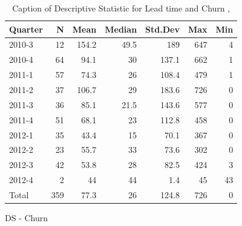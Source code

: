 \documentclass[UKenglish]{ifimaster}  %
\begin{document}
\begin{appendices}
\begin{table}[!htbp]
\begin{adjustwidth}{-1.5cm}{}
\begin{subfigure}[b]{0.3\textwidth}
{\begin{tabular}{ | l | r | r | r | r | r | r | }
 \hline
  \textbf{Quarter} &	\textbf{N} &	\textbf{Mean} &	\textbf{Median} & \textbf{Std.Dev} & \textbf{Max}	& \textbf{Min} \\ \hline
 2010-3   & 12 & 154.2 & 49.5 & 189 & 647 & 4 \\ \hline
 2010-4  & 64 & 94.1 & 30 & 137.1 & 662 & 1 \\ \hline
 2011-1  & 57 & 74.3 & 26 & 108.4 & 479 & 1 \\ \hline
 2011-2  & 37 & 106.7 & 29 & 183.6 & 726 & 0\\ \hline
 2011-3  & 36 & 85.1 & 21.5 & 143.6 & 577 & 0\\ \hline
 2011-4  & 51 & 68.1 & 23 & 112.8 & 458 & 0\\ \hline
 2012-1  & 35 & 43.4 & 15 & 70.1 & 367 & 0\\ \hline
 2012-2  & 23 & 55.7 & 33 & 73.6 & 302 & 0\\ \hline
 2012-3  & 42 & 53.8 & 28 & 82.5 & 424 & 3 \\ \hline
 2012-4  & 2 & 44 & 44 & 1.4 & 45 & 43 \\ \hline
 Total  & 359 & 77.3 & 26 & 124.8 & 726 & 0\\ \hline
\end{tabular}
}
\caption{DS - Churn}
 \label{DS:Churn:7}
\end{subfigure}
\end{adjustwidth}
\caption[Optional caption for list of figures]{Caption of Descriptive Statistic for Lead time and Churn  , }
\label{DS:7:3}
\end{table}


\end{appendices}
\end{document}
